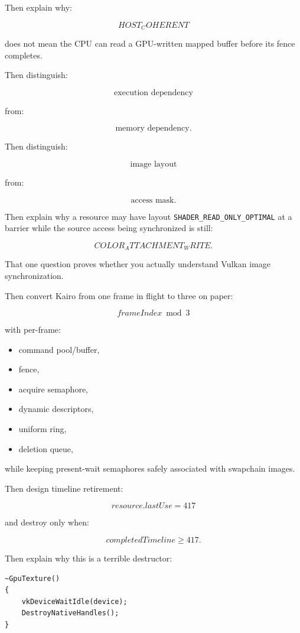 Then explain why:

\[
HOST_COHERENT
\]

does not mean the CPU can read a GPU-written mapped buffer before its fence completes.

Then distinguish:

\[
\text{execution dependency}
\]

from:

\[
\text{memory dependency}.
\]

Then distinguish:

\[
\text{image layout}
\]

from:

\[
\text{access mask}.
\]

Then explain why a resource may have layout \texttt{SHADER\_READ\_ONLY\_OPTIMAL} at a barrier while the source access being synchronized is still:

\[
COLOR_ATTACHMENT_WRITE.
\]

That one question proves whether you actually understand Vulkan image synchronization.

Then convert Kairo from one frame in flight to three on paper:

\[
frameIndex\bmod3
\]

with per-frame:

\begin{itemize}
\tightlist
\item
  command pool/buffer,
\item
  fence,
\item
  acquire semaphore,
\item
  dynamic descriptors,
\item
  uniform ring,
\item
  deletion queue,
\end{itemize}

while keeping present-wait semaphores safely associated with swapchain images.

Then design timeline retirement:

\[
resource.lastUse=417
\]

and destroy only when:

\[
completedTimeline\ge417.
\]

Then explain why this is a terrible destructor:

\begin{verbatim}
~GpuTexture()
{
    vkDeviceWaitIdle(device);
    DestroyNativeHandles();
}
\end{verbatim}

